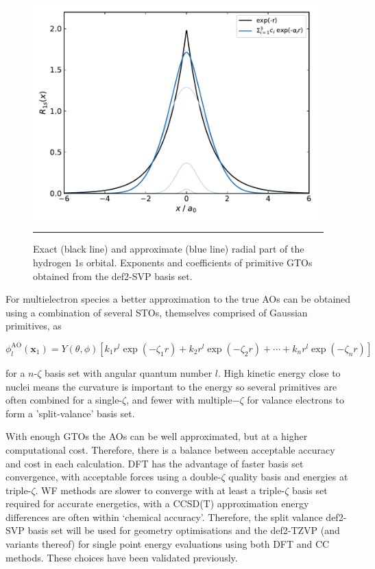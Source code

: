 \documentclass[main.tex]{subfiles}
\begin{document}
\begin{figure}[h!]
	\centering
	\includegraphics[width=11cm]{2/figs/fig1/gto_AO.pdf}
	\vspace{0.2cm}
	\hrule
	\caption{Exact (black line) and approximate (blue line) radial part of the hydrogen 1s orbital. Exponents and coefficients of primitive GTOs obtained from the def2-SVP basis set.\cite{BSE2019, Gulde2012}}
	\label{fig::gto_AO}
\end{figure}

For multielectron species a better approximation to the true AOs can be obtained using a combination of several STOs, themselves comprised of Gaussian primitives, as

\begin{equation}
	\phi_l^\text{AO}(\boldsymbol{x}_1) =  Y(\theta,\phi)[k_1 r^l \exp(-\zeta_1 r) + k_2 r^l \exp(-\zeta_2 r) + \cdots + k_n r^l \exp(-\zeta_n r)]
\end{equation}

for a $n$-$\zeta$ basis set with angular quantum number $l$. High kinetic energy close to nuclei means the curvature is important to the energy so several primitives are often combined for a single-$\zeta$, and fewer with multiple$-\zeta$ for valance electrons to form a 'split-valance' basis set.

With enough GTOs the AOs can be well approximated, but at a higher computational cost. Therefore, there is a balance between acceptable accuracy and cost in each calculation. DFT has the advantage of faster basis set convergence,\cite{Jan1995} with acceptable forces using a double-$\zeta$ quality basis and energies at triple-$\zeta$.\cite{Sure2015chemopen} WF methods are slower to converge with at least a triple-$\zeta$ basis set required for accurate energetics, with a CCSD(T) approximation energy differences are often within `chemical accuracy'.\cite{Zhang2012} Therefore, the split valance def2-SVP basis set will be used for geometry optimisations and the def2-TZVP (and variants thereof) for single point energy evaluations using both DFT and CC methods. These choices have been validated previously.\cite{Kirschner2020}
\end{document}

